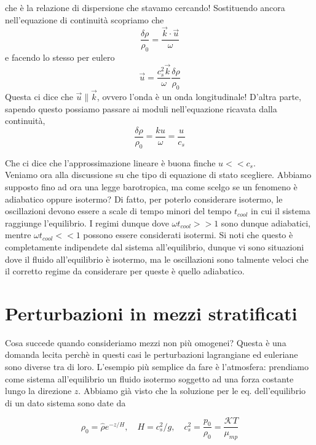 \documentclass{report}
\begin{document}
che è la relazione di dispersione che stavamo cercando! Sostituendo ancora nell'equazione di continuità scopriamo che 
\begin{equation}
    \frac{\delta\rho}{\rho_0} = \frac{\vec{k}\cdot \vec{u}}{\omega}
\end{equation}
e facendo lo stesso per eulero
\begin{equation}
    \vec{u} = \frac{c_s^2 \vec{k}}{\omega}\frac{\delta \rho}{\rho_0}
\end{equation}
Questa ci dice che $\vec{u} \parallel \vec{k}$, ovvero l'onda è un onda longitudinale! D'altra parte, sapendo questo possiamo passare ai moduli nell'equazione ricavata dalla continuità, 
\begin{equation}
    \frac{\delta \rho}{\rho_0} = \frac{ku}{\omega} = \frac{u}{c_s}
\end{equation}

Che ci dice che l'approssimazione lineare è buona finche $u << c_s$. \\

Veniamo ora alla discussione su che tipo di equazione di stato scegliere. Abbiamo supposto fino ad ora una legge barotropica, ma come scelgo se un fenomeno è adiabatico oppure isotermo? Di fatto, per poterlo considerare isotermo, le oscillazioni devono essere a scale di tempo minori del tempo $t_{cool}$ in cui il sistema raggiunge l'equilibrio. I regimi dunque dove $\omega t_{cool} >>1$ sono dunque adiabatici, mentre $\omega t_{cool} << 1$ possono essere considerati isotermi. Si noti che questo è completamente indipendete dal sistema all'equilibrio, dunque vi sono situazioni dove il fluido all'equilibrio è isotermo, ma le oscillazioni sono talmente veloci che il corretto regime da considerare per queste è quello adiabatico. 

\section{Perturbazioni in mezzi stratificati}

Cosa succede quando consideriamo mezzi non più omogenei? Questa è una domanda lecita perchè in questi casi le perturbazioni lagrangiane ed euleriane sono diverse tra di loro. L'esempio più semplice da fare è l'atmosfera: prendiamo come sistema all'equilibrio un fluido isotermo soggetto ad una forza costante lungo la direzione $z$. Abbiamo già visto che la soluzione per le eq. dell'equilibrio di un dato sistema sono date da 

\begin{equation}
    \rho_0 = \hat{\rho}e^{-z/H}, \quad H = c_s^2/g, \quad c_s^2 = \frac{p_0}{\rho_0} = \frac{\mathcal{K}T}{\mu_{mp}}
\end{equation}
\end{document}
